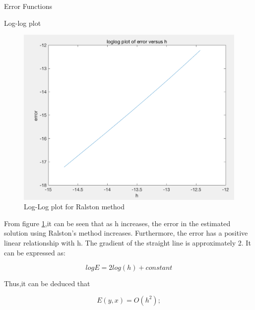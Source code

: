 \documentclass[10pt,a4paper]{article}
\begin{document}
\begin{subsection}{Error Functions}
\begin{subsection}{Log-log plot}
\begin{figure}[h]
    \centering
    \includegraphics[scale=0.5]{errorloglogfinal1}
    \caption{Log-Log plot for Ralston method}
    \label{fig:heun_error_loglog} %
\end{figure}

From figure \ref{fig:heun_error_loglog},it can be seen that as h increases, the error in the estimated solution using Ralston's method increases. Furthermore, the error has a positive linear relationship with h. The gradient of the straight line is approximately 2. It can be expressed as:

\begin{equation}
logE=2log(h)+constant
\end{equation}

Thus,it can be deduced that

\begin{equation}
E(y,x)=O(h^2);
\end{equation}
\end{subsection}
\end{subsection}
\end{document}
